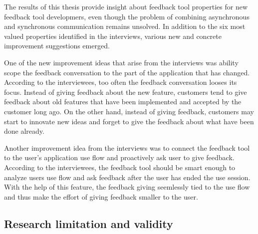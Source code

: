 \documentclass[english,12pt,a4paper,pdftex]{article}
\begin{document}
The results of this thesis provide insight about feedback tool properties for new feedback tool developmers, even though the problem of combining asynchronous and synchronous communication remains unsolved. In addition to the six most valued properties identified in the interviews, various new and concrete improvement suggestions emerged.

One of the new improvement ideas that arise from the interviews was ability scope the feedback conversation to the part of the application that has changed. According to the interviewees, too often the feedback conversation looses its focus. Instead of giving feedback about the new feature, customers tend to give feedback about old features that have been implemented and accepted by the customer long ago. On the other hand, instead of giving feedback, customers may start to innovate new ideas and forget to give the feedback about what have been done already.

Another improvement idea from the interviews was to connect the feedback tool to the user's application use flow and proactively ask user to give feedback. According to the interviewees, the feedback tool should be smart enough to analyze users use flow and ask feedback after the user has ended the use session. With the help of this feature, the feedback giving seemlessly tied to the use flow and thus make the effort of giving feedback smaller to the user.

\subsection{Research limitation and validity}

\end{document}
